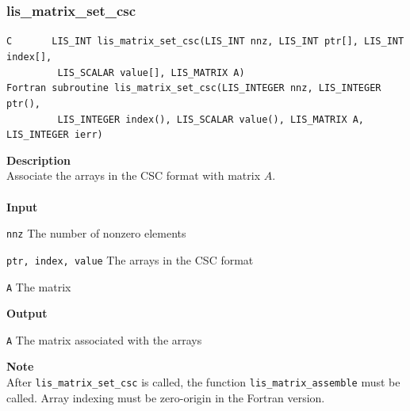\documentclass[a4paper]{article}
\newcommand{\namelistlabel}[1]{\mbox{#1}\hfill}
\newenvironment{namelist}[1]{%
\begin{list}{}
  {\let\makelabel\namelistlabel
  \settowidth{\labelwidth}{#1}
  \setlength{\leftmargin}{1.1\labelwidth}}
  }{%
\end{list}}
\begin{document}
\subsubsection{lis\_matrix\_set\_csc}
\begin{screen}
\verb|C       LIS_INT lis_matrix_set_csc(LIS_INT nnz, LIS_INT ptr[], LIS_INT index[],|\\
\verb|         LIS_SCALAR value[], LIS_MATRIX A)|\\
\verb|Fortran subroutine lis_matrix_set_csc(LIS_INTEGER nnz, LIS_INTEGER ptr(),|\\
\verb|         LIS_INTEGER index(), LIS_SCALAR value(), LIS_MATRIX A, LIS_INTEGER ierr)|
\end{screen}
{\bf Description}\\
\indent
Associate the arrays in the CSC format with matrix $A$.
\\ \\
\noindent
{\bf Input}
\begin{namelist}{XXXXXXXXXXXXXXXXXXXX}
\item[\tt nnz] The number of nonzero elements
\item[\tt ptr, index, value] The arrays in the CSC format
\item[\tt A] The matrix
\end{namelist}
{\bf Output}
\begin{namelist}{XXXXXXXXXXXXXXXXXXXX}
\item[\tt A] The matrix associated with the arrays 
\end{namelist}
\noindent
{\bf Note}\\
\indent
After \verb|lis_matrix_set_csc| is called, 
the function \verb|lis_matrix_assemble| must be called. 
Array indexing must be zero-origin in the Fortran version.

\newpage
\end{document}
